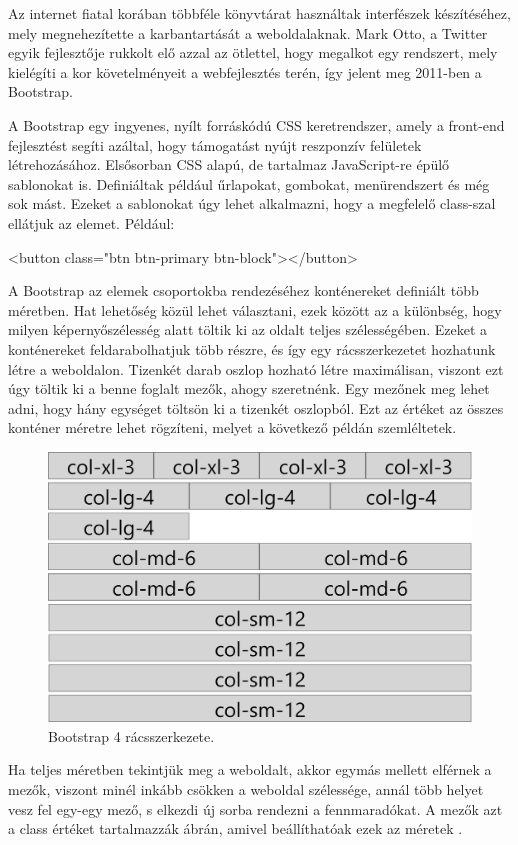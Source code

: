 \newpage
{}

Az internet fiatal korában többféle könyvtárat használtak interfészek készítéséhez, mely megnehezítette a karbantartását a weboldalaknak. Mark Otto, a Twitter egyik fejlesztője rukkolt elő azzal az ötlettel, hogy megalkot egy rendszert, mely kielégíti a kor követelményeit a webfejlesztés terén, így jelent meg 2011-ben a Bootstrap.

A Bootstrap egy ingyenes, nyílt forráskódú CSS keretrendszer, amely a front-end fejlesztést segíti azáltal, hogy támogatást nyújt reszponzív felületek létrehozásához. Elsősorban CSS alapú, de tartalmaz JavaScript-re épülő sablonokat is. Definiáltak például űrlapokat, gombokat, menürendszert és még sok mást. Ezeket a sablonokat úgy lehet alkalmazni, hogy a megfelelő class-szal ellátjuk az elemet. Például:
\begin{HTML5}
<button class="btn btn-primary btn-block"></button>
\end{HTML5}

A Bootstrap az elemek csoportokba rendezéséhez konténereket definiált több méretben. Hat lehetőség közül lehet választani, ezek között az a különbség, hogy milyen képernyőszélesség alatt töltik ki az oldalt teljes szélességében. Ezeket a konténereket feldarabolhatjuk több részre, és így egy rácsszerkezetet hozhatunk létre a weboldalon. Tizenkét darab oszlop hozható létre maximálisan, viszont ezt úgy töltik ki a benne foglalt mezők, ahogy szeretnénk. Egy mezőnek meg lehet adni, hogy hány egységet töltsön ki a tizenkét oszlopból. Ezt az értéket az összes konténer méretre lehet rögzíteni, melyet a következő példán szemléltetek.

\begin{figure}[ht]
\centering
\includegraphics[scale=0.15]{images/bootstrap.png}
\caption{Bootstrap 4 rácsszerkezete.}
\label{fig:bs4}
\end{figure}
\noindent Ha teljes méretben tekintjük meg a weboldalt, akkor egymás mellett elférnek a mezők, viszont minél inkább csökken a weboldal szélessége, annál több helyet vesz fel egy-egy mező, s elkezdi új sorba rendezni a fennmaradókat. A mezők azt a class értéket tartalmazzák  ábrán, amivel beállíthatóak ezek az méretek \cite{Bootstrap}.

